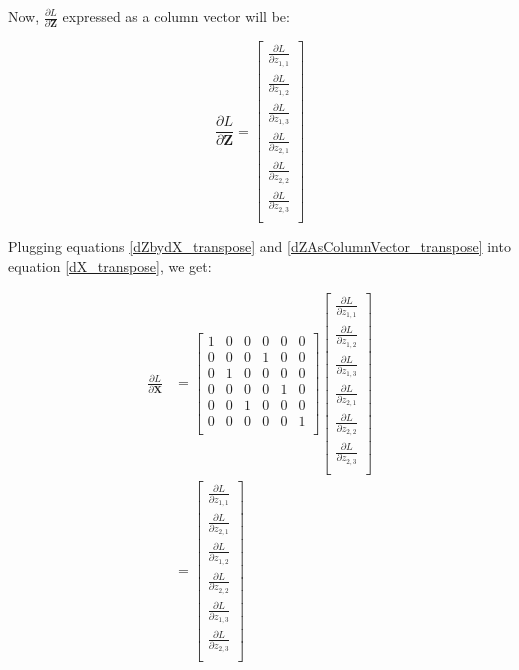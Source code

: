\documentclass{article}
\newcommand{\matr}[1]{\mathbf{#1}} %
\begin{document}
Now, $\frac{\partial L}{\partial \matr{Z}}$ expressed as a column vector will be:

\begin{equation} \label{dZAsColumnVector_transpose}
\frac{\partial L}{\partial \matr{Z}} =
\begin{bmatrix}
\frac{\partial L}{\partial z_{1,1}} \\[0.7em]
\frac{\partial L}{\partial z_{1,2}} \\[0.7em]
\frac{\partial L}{\partial z_{1,3}} \\[0.7em]
\frac{\partial L}{\partial z_{2,1}} \\[0.7em]
\frac{\partial L}{\partial z_{2,2}} \\[0.7em]
\frac{\partial L}{\partial z_{2,3}} \\[0.7em]
\end{bmatrix}
\end{equation}


Plugging equations \ref{dZbydX_transpose} and \ref{dZAsColumnVector_transpose} into equation \ref{dX_transpose}, we get:

\begin{align}
\frac{\partial L}{\partial \matr{X}} &=
\begin{bmatrix}
1 & 0 & 0 & 0 & 0 & 0 \\%
0 & 0 & 0 & 1 & 0 & 0 \\%
0 & 1 & 0 & 0 & 0 & 0 \\%
0 & 0 & 0 & 0 & 1 & 0 \\%
0 & 0 & 1 & 0 & 0 & 0 \\%
0 & 0 & 0 & 0 & 0 & 1 \\%
\end{bmatrix}
\begin{bmatrix}
\frac{\partial L}{\partial z_{1,1}} \\[0.7em]
\frac{\partial L}{\partial z_{1,2}} \\[0.7em]
\frac{\partial L}{\partial z_{1,3}} \\[0.7em]
\frac{\partial L}{\partial z_{2,1}} \\[0.7em]
\frac{\partial L}{\partial z_{2,2}} \\[0.7em]
\frac{\partial L}{\partial z_{2,3}} \\[0.7em]
\end{bmatrix}
\nonumber \\
&=
\begin{bmatrix}
\frac{\partial L}{\partial z_{1,1}} \\[0.7em]
\frac{\partial L}{\partial z_{2,1}} \\[0.7em]
\frac{\partial L}{\partial z_{1,2}} \\[0.7em]
\frac{\partial L}{\partial z_{2,2}} \\[0.7em]
\frac{\partial L}{\partial z_{1,3}} \\[0.7em]
\frac{\partial L}{\partial z_{2,3}} \\[0.7em]
\end{bmatrix} \label{dXAsColumnVector_transpose}
\end{align}
\end{document}
